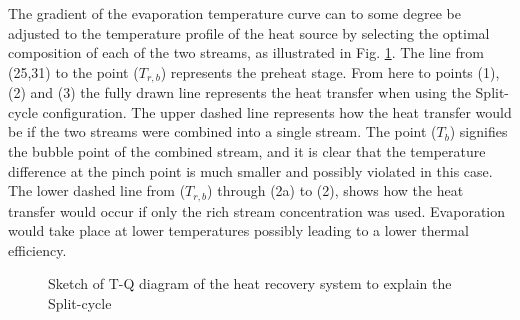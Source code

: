 \documentclass[final,times,5p]{elsarticle}
\begin{document}
The gradient of the evaporation temperature curve can to some degree be adjusted to the temperature profile of the heat source by selecting the optimal composition of each of the two streams, as illustrated in Fig. \ref{fig:theory}. The line from (25,31) to the point ($T_{r,b}$) represents the preheat stage. From here to points (1), (2) and (3) the fully drawn line represents the heat transfer when using the Split-cycle configuration. The upper dashed line represents how the heat transfer would be if the two streams were combined into a single stream. The point ($T_{b}$) signifies the bubble point of the combined stream, and it is clear that the temperature difference at the pinch point is much smaller and possibly violated in this case. The lower dashed line from ($T_{r,b}$) through (2a) to (2), shows how the heat transfer would occur if only the rich stream concentration was used. Evaporation would take place at lower temperatures possibly leading to a lower thermal efficiency. 



\begin{figure}[htpb]
\centering
{}

\caption{Sketch of T-Q diagram of the heat recovery system to explain the Split-cycle}
\label{fig:theory}
\end{figure}
\end{document}
